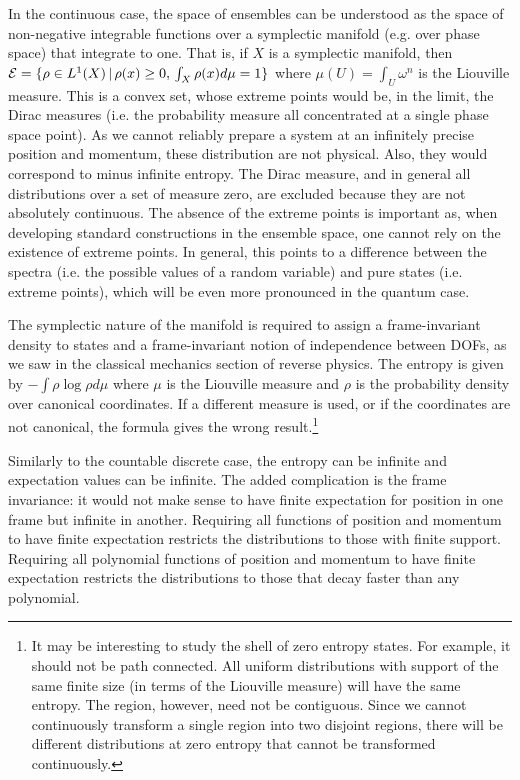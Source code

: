 In the continuous case, the space of ensembles can be understood as the space of non-negative integrable functions over a symplectic manifold (e.g.  over phase space) that integrate to one. That is, if $X$ is a symplectic manifold, then $\mathcal{E} = \{ \rho \in L^1(X) \, | \, \rho(x) \geq 0, \, \int_X \rho(x) d\mu = 1 \} $ where $\mu(U)=\int_U \omega^n$ is the Liouville measure. This is a convex set, whose extreme points would be, in the limit, the Dirac measures (i.e. the probability measure all concentrated at a single phase space point). As we cannot reliably prepare a system at an infinitely precise position and momentum, these distribution are not physical. Also, they would correspond to minus infinite entropy. The Dirac measure, and in general all distributions over a set of measure zero, are excluded because they are not absolutely continuous. The absence of the extreme points is important as, when developing standard constructions in the ensemble space, one cannot rely on the existence of extreme points. In general, this points to a difference between the spectra (i.e. the possible values of a random variable) and pure states (i.e. extreme points), which will be even more pronounced in the quantum case.

The symplectic nature of the manifold is required to assign a frame-invariant density to states and a frame-invariant notion of independence between DOFs, as we saw in the classical mechanics section of reverse physics. The entropy is given by $- \int \rho \log \rho d\mu$ where $\mu$ is the Liouville measure and $\rho$ is the probability density over canonical coordinates. If a different measure is used, or if the coordinates are not canonical, the formula gives the wrong result.\footnote{It may be interesting to study the shell of zero entropy states. For example, it should not be path connected. All uniform distributions with support of the same finite size (in terms of the Liouville measure) will have the same entropy. The region, however, need not be contiguous. Since we cannot continuously transform a single region into two disjoint regions, there will be different distributions at zero entropy that cannot be transformed continuously.}


Similarly to the countable discrete case, the entropy can be infinite and expectation values can be infinite. The added complication is the frame invariance: it would not make sense to have finite expectation for position in one frame but infinite in another. Requiring all functions of position and momentum to have finite expectation restricts the distributions to those with finite support. Requiring all polynomial functions of position and momentum to have finite expectation restricts the distributions to those that decay faster than any polynomial.

